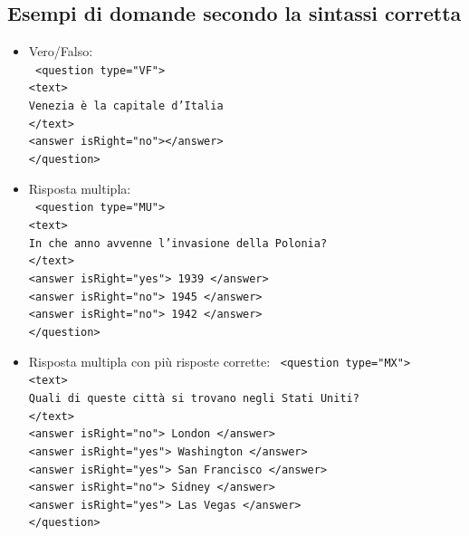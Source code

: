 \documentclass[a4paper,11pt]{article}
\newcommand{\code}[1]{\texttt{#1}}
\begin{document}
\subsection{Esempi di domande secondo la sintassi corretta}
\begin{itemize}
\item Vero/Falso:\\
\code{
<question type="VF">\\
	<text>\\
		Venezia è la capitale d'Italia\\
	</text>\\
	<answer isRight="no"></answer>\\
</question>\\}

\item Risposta multipla:\\
\code{
<question type="MU">\\
    <text>\\
    	In che anno avvenne l'invasione della Polonia?\\
    </text>\\
    <answer isRight="yes"> 1939 </answer>\\
    <answer isRight="no"> 1945 </answer>\\
    <answer isRight="no"> 1942 </answer>\\
</question>\\}

\item Risposta multipla con più risposte corrette:
\code{
<question type="MX">\\
	<text>\\
    	Quali di queste città si trovano negli Stati Uniti?\\
    </text>\\
    <answer isRight="no"> London </answer>\\
    <answer isRight="yes"> Washington </answer>\\
    <answer isRight="yes"> San Francisco </answer>\\
    <answer isRight="no"> Sidney </answer>\\
    <answer isRight="yes"> Las Vegas </answer>\\
</question>\\}


\end{itemize}
\end{document}
